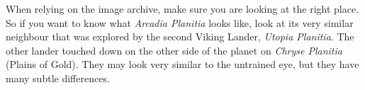 When relying on the image archive, make sure you are looking at the right place. So if you want to know what {\it Arcadia Planitia} looks like, look at its very similar neighbour that was explored by the second Viking Lander, {\it Utopia Planitia}. The other lander touched down on the other side of the planet on {\it Chryse Planitia} (Plains of Gold). They may look very similar to the untrained eye, but they have many subtle differences.

\StopChapter

